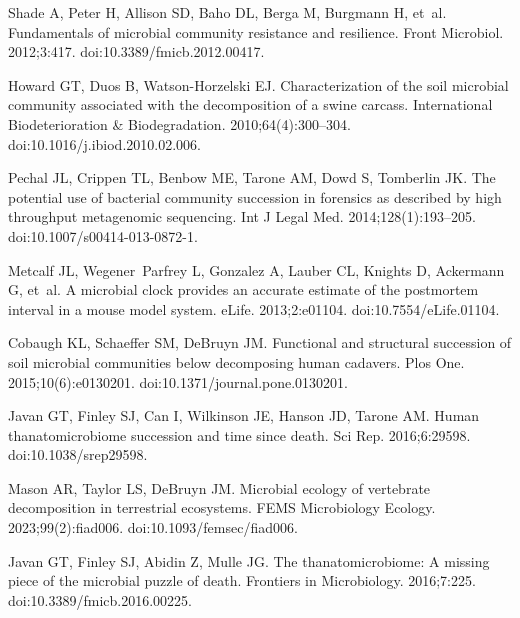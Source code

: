 \documentclass[
  10pt,
  letterpaper,
]{article}
\begin{document}
\nolinenumbers
  \begin{thebibliography}{10}
    
    Shade A, Peter H, Allison SD, Baho DL, Berga M, Burgmann H, et~al.
    \newblock Fundamentals of microbial community resistance and resilience.
    \newblock Front Microbiol. 2012;3:417.
    \newblock doi:{10.3389/fmicb.2012.00417}.
    
    Howard GT, Duos B, Watson-Horzelski EJ.
    \newblock Characterization of the soil microbial community associated with the decomposition of a swine carcass.
    \newblock International Biodeterioration \& Biodegradation. 2010;64(4):300--304.
    \newblock doi:{10.1016/j.ibiod.2010.02.006}.
    
    Pechal JL, Crippen TL, Benbow ME, Tarone AM, Dowd S, Tomberlin JK.
    \newblock The potential use of bacterial community succession in forensics as described by high throughput metagenomic sequencing.
    \newblock Int J Legal Med. 2014;128(1):193--205.
    \newblock doi:{10.1007/s00414-013-0872-1}.
    
    Metcalf JL, Wegener~Parfrey L, Gonzalez A, Lauber CL, Knights D, Ackermann G, et~al.
    \newblock A microbial clock provides an accurate estimate of the postmortem interval in a mouse model system.
    \newblock eLife. 2013;2:e01104.
    \newblock doi:{10.7554/eLife.01104}.
    
    Cobaugh KL, Schaeffer SM, DeBruyn JM.
    \newblock Functional and structural succession of soil microbial communities below decomposing human cadavers.
    \newblock Plos One. 2015;10(6):e0130201.
    \newblock doi:{10.1371/journal.pone.0130201}.
    
    Javan GT, Finley SJ, Can I, Wilkinson JE, Hanson JD, Tarone AM.
    \newblock Human thanatomicrobiome succession and time since death.
    \newblock Sci Rep. 2016;6:29598.
    \newblock doi:{10.1038/srep29598}.
    
    Mason AR, Taylor LS, DeBruyn JM.
    \newblock Microbial ecology of vertebrate decomposition in terrestrial ecosystems.
    \newblock FEMS Microbiology Ecology. 2023;99(2):fiad006.
    \newblock doi:{10.1093/femsec/fiad006}.
    
    Javan GT, Finley SJ, Abidin Z, Mulle JG.
    \newblock The thanatomicrobiome: {A} missing piece of the microbial puzzle of death.
    \newblock Frontiers in Microbiology. 2016;7:225.
    \newblock doi:{10.3389/fmicb.2016.00225}.
    

\end{thebibliography}
\end{document}
